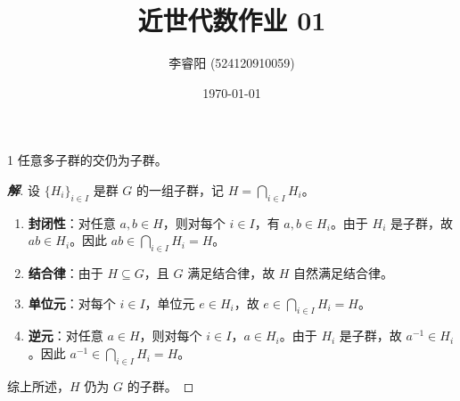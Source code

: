 \documentclass[12pt, a4paper]{article}
\title{近世代数作业 01}
\author{李睿阳 (524120910059)}
\date{\today}
\newenvironment{solution}{
    \begin{proof}[\textbf{解}]
}{
    \end{proof}
}
\begin{document}
\maketitle

\begin{problem}{1}
    任意多子群的交仍为子群。
\end{problem}

\begin{solution}
    设 $\{H_i\}_{i \in I}$ 是群 $G$ 的一组子群，记 $H = \bigcap_{i \in I} H_i$。
    \begin{enumerate}[(1)]
        \item \textbf{封闭性}：对任意 $a, b \in H$，则对每个 $i \in I$，有 $a, b \in H_i$。由于 $H_i$ 是子群，故 $ab \in H_i$。因此 $ab \in \bigcap_{i \in I} H_i = H$。
        \item \textbf{结合律}：由于 $H \subseteq G$，且 $G$ 满足结合律，故 $H$ 自然满足结合律。
        \item \textbf{单位元}：对每个 $i \in I$，单位元 $e \in H_i$，故 $e \in \bigcap_{i \in I} H_i = H$。
        \item \textbf{逆元}：对任意 $a \in H$，则对每个 $i \in I$，$a \in H_i$。由于 $H_i$ 是子群，故 $a^{-1} \in H_i$。因此 $a^{-1} \in \bigcap_{i \in I} H_i = H$。
    \end{enumerate}
    综上所述，$H$ 仍为 $G$ 的子群。
\end{solution}
\end{document}
